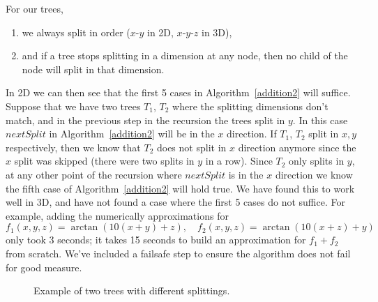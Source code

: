 \documentclass{article}
\begin{document}
For our trees,
\begin{enumerate}
\item we always split in order ($x$-$y$ in 2D, $x$-$y$-$z$ in 3D),
\item and if a tree stops splitting in a dimension at any node, then no child of the node will split in that dimension.
\end{enumerate}
In 2D we can then see that the first 5 cases in Algorithm~\ref{addition2} will suffice. Suppose that we have two trees $T_1$, $T_2$ where the splitting dimensions don't match, and in the previous step in the recursion the trees split in $y$. In this case $nextSplit$ in Algorithm~\ref{addition2} will be in the $x$ direction. If $T_1$, $T_2$ split in $x,y$ respectively, then we know that $T_2$ does not split in $x$ direction anymore since the $x$ split was skipped (there were two splits in $y$ in a row). Since $T_2$ only splits in $y$, at any other point of the recursion where $nextSplit$ is in the $x$ direction we know the fifth case of Algorithm~\ref{addition2} will hold true. We have found this to work well in 3D, and have not found a case where the first 5 cases do not suffice. For example, adding the numerically approximations for
\begin{equation}
f_1(x,y,z) = \arctan(10(x+y)+z), \quad f_2(x,y,z) = \arctan(10(x+z)+y)
\end{equation}
only took 3 seconds; it takes 15 seconds to build an approximation for $f_1+f_2$ from scratch. We've included a failsafe step to ensure the algorithm does not fail for good measure.



\begin{figure}[!htb]
\centering
{}

\caption{Example of two trees with different splittings.}
\label{bad_split_2}
\end{figure}
\end{document}
